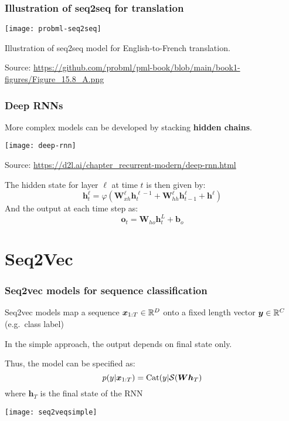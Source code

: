 \documentclass[smaller]{beamer}
\begin{document}
\begin{frame}
  \frametitle{Illustration of seq2seq for translation}\pe

  \begin{center}
    \texttt{[image: probml-seq2seq]}

    Illustration of seq2seq model for English-to-French translation.

    {\tiny Source: \url{https://github.com/probml/pml-book/blob/main/book1-figures/Figure_15.8_A.png}}
  \end{center}

  

\end{frame}
\begin{frame}
  \frametitle{Deep RNNs}
  \pe
  More complex models can be developed by stacking \textbf{hidden chains}.\pe

  \begin{center}
    \texttt{[image: deep-rnn]}

    {\tiny Source: \url{https://d2l.ai/chapter_recurrent-modern/deep-rnn.html}}
  \end{center}
  \pe
  
  The hidden state for layer $\ell$ at time $t$ is then given by:\pe
  \begin{equation}
    \bm h_t^{\ell}  = \varphi(\bm W_{xh}^{\ell}\bm h_t^{\ell-1} + \bm W_{hh}^{\ell}\bm h_{t-1}^{\ell} + \bm h^{\ell})
  \end{equation}
  \pe
  And the output at each time step as:\pe
  \begin{equation}
    \bm o_t = \bm W_{ho}\bm h_t^{L} + \bm b_o
  \end{equation}
  
\end{frame}


\section{Seq2Vec}
\begin{frame}
  \frametitle{Seq2vec models for sequence classification}
  \pe
  Seq2vec models map a sequence $\bm x_{1:T}\in\mathbb R^{D}$ onto a fixed length vector $\bm y\in\mathbb R^{C}$ (e.g.\ class label) \pe

  In the simple approach, the output depends on final state only. \pe
  
  Thus, the model can be specified as:\pe
  \begin{equation}
    p(y|\bm x_{1:T}) = \text{Cat}(y|\mathcal{S}(\bm W\bm h_{T})
  \end{equation}
  \pe
  where $\bm h_{T}$ is the final state of the RNN
  \pe

    \begin{center}
    \texttt{[image: seq2veqsimple]}

  \end{center}
  
 \end{frame}
\end{document}
